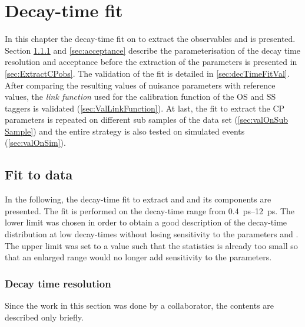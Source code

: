 \chapter{Decay-time fit}
\label{chap:dectimeFit}

\linespread{1.08}\selectfont
In this chapter the decay-time fit on \BdToDpi to extract the \CP observables \Sf and \Sfbar is presented.
Section \ref{sec:resolution} and \ref{sec:acceptance} describe the parameterisation of the decay time resolution and acceptance before the extraction of the \CP parameters is presented in \cref{sec:ExtractCPobs}.
The validation of the fit is detailed in \cref{sec:decTimeFitVal}.
After comparing the resulting values of nuisance parameters with reference values, the \emph{link function} used for the calibration function of the OS and SS taggers is validated (\cref{sec:ValLinkFunction}).
At last, the fit to extract the CP parameters is repeated on different sub samples of the data set (\cref{sec:valOnSub Sample}) and the entire strategy is also tested on simulated events (\cref{sec:valOnSim}).

\section{Fit to data}

In the following, the decay-time fit to extract \Sf and \Sfbar and its components are presented.
The fit is performed on the decay-time range from \SIrange{0.4}{12}{\pico\second}.
The lower limit was chosen in order to obtain a good description of the decay-time distribution at low decay-times without losing sensitivity to the parameters \Sf and \Sfbar.
The upper limit was set to a value such that the statistics is already too small so that an enlarged range would no longer add sensitivity to the \CP parameters.

\subsection{Decay time resolution}
\label{sec:resolution}

Since the work in this section was done by a collaborator, the contents are described only briefly.

